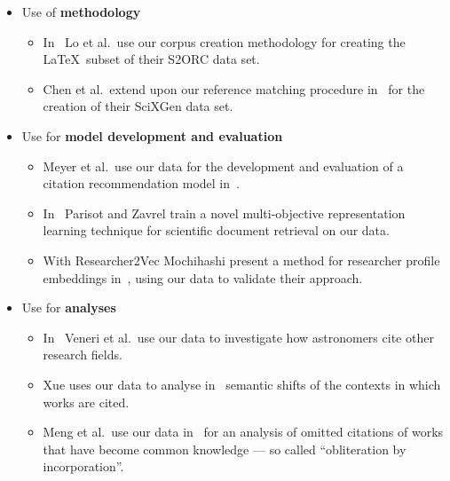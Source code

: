 \begin{itemize}
    \item Use of \textbf{methodology}
    \begin{itemize}
        \item In~\cite{Lo2020} Lo et al.\ use our corpus creation methodology for creating the \LaTeX\ subset of their S2ORC data set.
        \item Chen et al.\ extend upon our reference matching procedure in~\cite{Chen2021} for the creation of their SciXGen data set.
    \end{itemize}
    \item Use for \textbf{model development and evaluation}
    \begin{itemize}
        \item Meyer et al.\ use our data for the development and evaluation of a citation recommendation model in~\cite{Citcom2021}. %
        \item In~\cite{Parisot2022} Parisot and Zavrel train a novel multi-objective representation learning technique for scientific document retrieval on our data.
        \item With Researcher2Vec Mochihashi present a method for researcher profile embeddings in~\cite{Mochihashi2023}, using our data to validate their approach.
    \end{itemize}
    \item Use for \textbf{analyses}
    \begin{itemize}
        \item In~\cite{Veneri2022} Veneri et al.\ use our data to investigate how astronomers cite other research fields.
        \item Xue uses our data to analyse in~\cite{Xue2021} semantic shifts of the contexts in which works are cited. %
        \item Meng et al.\ use our data in~\cite{Meng2023} for an analysis of omitted citations of works that have become common knowledge --- so called ``obliteration by incorporation''.
    \end{itemize}
\end{itemize}

